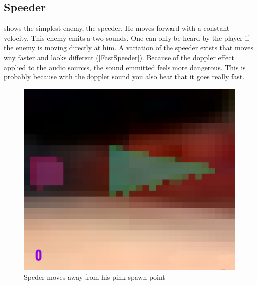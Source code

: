 \subsection{Speeder}
 shows the simplest enemy, the speeder. He moves forward with a constant velocity. This enemy emits a two sounds. One can only be heard by the player if the enemy is moving directly at him. A variation of the speeder exists that moves way faster and looks different (\cref{FastSpeeder}). Because of the doppler effect applied to the audio sources, the sound emmitted feels more dangerous. This is probably because with the doppler sound you also hear that it goes really fast.

\begin{figure}[p]
  \centering
  \includegraphics[width=\imgWidth]{images/game_systems/SpeederSpawns.png}
  \caption{Speder moves away from his pink spawn point}
  \label{Speeder}
\end{figure}

